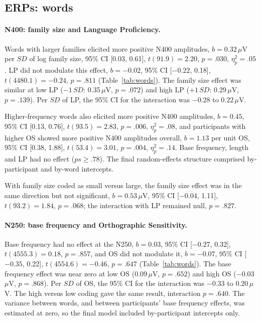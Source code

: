 \subsection{ERPs: words}

\paragraph{N400: family size and Language Proficiency.}
Words with larger families elicited more positive N400 amplitudes, $b = 0.32$\,$\mu$V
per $SD$ of log family size, 95\% CI [0.03, 0.61], $t(91.9) = 2.20$, $p = .030$,
$\eta^2_p = .05$. LP did not modulate this effect, $b = -0.02$, 95\% CI
[$-0.22$, 0.18], $t(4480.1) = -0.24$, $p = .811$ (Table~\ref{tab:words}). The
family size effect was similar at low LP ($-1\,SD$: 0.35\,$\mu$V, $p = .072$)
and high LP ($+1\,SD$: 0.29\,$\mu$V, $p = .139$). Per $SD$ of LP, the 95\% CI
for the interaction was $-0.28$ to $0.22$\,$\mu$V.

Higher-frequency words also elicited more positive N400 amplitudes, $b = 0.45$,
95\% CI [0.13, 0.76], $t(93.5) = 2.83$, $p = .006$, $\eta^2_p = .08$, and
participants with higher OS showed more positive N400 amplitudes overall,
$b = 1.13$ per unit OS, 95\% CI [0.38, 1.88], $t(53.4) = 3.01$, $p = .004$,
$\eta^2_p = .14$. Base frequency, length and LP had no effect ($ps \geq .78$).
The final random-effects structure comprised by-participant and by-word
intercepts.

With family size coded as small versus large, the family size effect was in the
same direction but not significant, $b = 0.53$\,$\mu$V, 95\% CI [$-0.04$, 1.11],
$t(93.2) = 1.84$, $p = .068$; the interaction with LP remained null, $p = .827$.

\paragraph{N250: base frequency and Orthographic Sensitivity.}
Base frequency had no effect at the N250, $b = 0.03$, 95\% CI [$-0.27$, 0.32],
$t(4555.3) = 0.18$, $p = .857$, and OS did not modulate it, $b = -0.07$, 95\% CI
[$-0.35$, 0.22], $t(4554.6) = -0.46$, $p = .647$ (Table~\ref{tab:words}). The
base frequency effect was near zero at low OS ($0.09$\,$\mu$V, $p = .652$) and
high OS ($-0.03$\,$\mu$V, $p = .868$). Per $SD$ of OS, the 95\% CI for the
interaction was $-0.33$ to $0.20$\,$\mu$V. The high versus low coding gave the
same result, interaction $p = .640$. The variance between words, and between
participants' base frequency effects, was estimated at zero, so the final model
included by-participant intercepts only.

